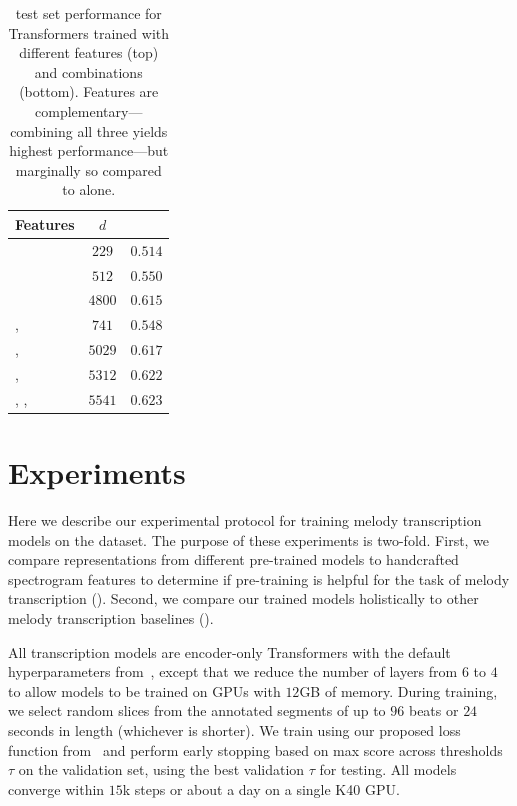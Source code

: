\begin{table}[t]
    \centering
    \begin{tabular}{lcc}
\toprule
Features & $d$ & \fone{} \\
\midrule
\mel{} & $229$ & $0.514$ \\
\mtthree{} & $512$ & $0.550$ \\
\jukebox{} & $4800$ & $\bm{0.615}$ \\
\midrule
\mel{}, \mtthree{} & $741$ & $0.548$ \\
\mel{}, \jukebox{} & $5029$ & $0.617$ \\
\mtthree{}, \jukebox{} & $5312$ & $0.622$ \\
\mel{}, \mtthree{}, \jukebox{} & $5541$ & $\bm{0.623}$ \\
\bottomrule
    \end{tabular}
    \caption{\hooktheory{} test set performance for Transformers trained with different features (top) and combinations (bottom). Features are complementary---combining all three yields highest performance---but marginally so compared to \jukebox{} alone.}
    \label{tab:hooktheory_test}
    \vspace{-3mm}
\end{table}

\section{Experiments}
\label{sec:experiments}

Here we describe our experimental protocol for training melody transcription models on the \hooktheory{} dataset. 
The purpose of these experiments is two-fold. 
First, we compare representations from different pre-trained models to handcrafted spectrogram features to determine if pre-training is helpful for the task of melody transcription (). 
Second, we compare our trained models holistically to other melody transcription baselines ().

All transcription models are encoder-only Transformers with the default hyperparameters from~\cite{vaswani2017attention}, 
except that we reduce the number of layers from $6$ to $4$ to allow models to be trained on GPUs with $12$GB of memory. 
During training, we select random slices from the annotated segments of up to $96$ beats or $24$ seconds in length (whichever is shorter). 
We train using our proposed loss function from~ and perform early stopping based on max \fone{} score across thresholds $\tau$ on the validation set, using the best validation $\tau$ for testing. 
All models converge within $15$k steps or about a day on a single K40 GPU. 

